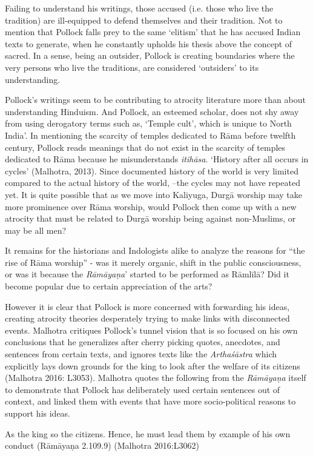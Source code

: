 Failing to understand his writings, those accused (i.e. those who live the tradition) are ill-equipped to defend themselves and their tradition. Not to mention that Pollock falls prey to the same ‘elitism’ that he has accused Indian texts to generate, when he constantly upholds his thesis above the concept of sacred. In a sense, being an outsider, Pollock is creating boundaries where the very persons who live the traditions, are considered ‘outsiders’ to its understanding.

Pollock’s writings seem to be contributing to atrocity literature more than about understanding Hinduism. And Pollock, an esteemed scholar, does not shy away from using derogatory terms such as, ‘Temple cult’, which is unique to North India’. In mentioning the scarcity of temples dedicated to Rāma before twelfth century, Pollock reads meanings that do not exist in the scarcity of temples dedicated to Rāma because he misunderstands \textit{itihāsa}. ‘History after all occurs in cycles’ (Malhotra, 2013). Since documented history of the world is very limited compared to the actual history of the world, --the cycles may not have repeated yet. It is quite possible that as we move into Kaliyuga, Durgā worship may take more prominence over Rāma worship, would Pollock then come up with a new atrocity that must be related to Durgā worship being against non-Muslims, or may be all men?

It remains for the historians and Indologists alike to analyze the reasons for “the rise of Rāma worship” - was it merely organic, shift in the public consciousness, or was it because the \textit{Rāmāyaṇa}’ started to be performed as Rāmlīlā? Did it become popular due to certain appreciation of the arts?

However it is clear that Pollock is more concerned with forwarding his ideas, creating atrocity theories desperately trying to make links with disconnected events. Malhotra critiques Pollock’s tunnel vision that is so focused on his own conclusions that he generalizes after cherry picking quotes, anecdotes, and sentences from certain texts, and ignores texts like the \textit{Arthaśāstra} which explicitly lays down grounds for the king to look after the welfare of its citizens (Malhotra 2016: L3053). Malhotra quotes the following from the \textit{Rāmāyaṇa} itself to demonstrate that Pollock has deliberately used certain sentences out of context, and linked them with events that have more socio-political reasons to support his ideas.

\begin{myquote}
As the king so the citizens. Hence, he must lead them by example of his own conduct \hfill (Rāmāyaṇa 2.109.9) (Malhotra 2016:L3062)
\end{myquote}

